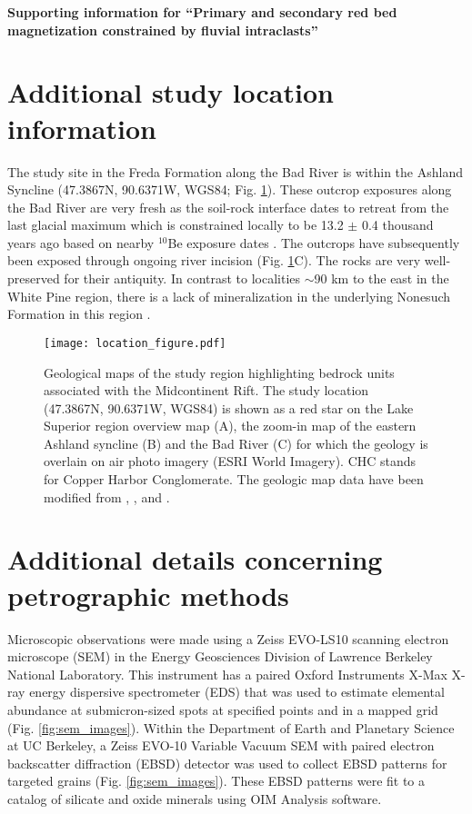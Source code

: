 \documentclass[11pt,letterpaper]{article}
\begin{document}
\begin{flushleft}
{\Large \textbf{Supporting information for ``Primary and secondary red bed magnetization constrained by fluvial intraclasts''}}

\end{flushleft}

\section*{Additional study location information}
The study site in the Freda Formation along the Bad River is within the Ashland Syncline (47.3867\textdegree N, 90.6371\textdegree W, WGS84; Fig. \ref{fig:location_figure}). These outcrop exposures along the Bad River are very fresh as the soil-rock interface dates to retreat from the last glacial maximum which is constrained locally to be 13.2 $\pm$ 0.4 thousand years ago based on nearby $^{10}$Be exposure dates \citep{Ullman2015a}. The outcrops have subsequently been exposed through ongoing river incision (Fig. \ref{fig:location_figure}C). The rocks are very well-preserved for their antiquity. In contrast to localities $\sim$90 km to the east in the White Pine region, there is a lack of mineralization in the underlying Nonesuch Formation in this region \citep{Stewart2017a}. 

\begin{figure}[!ht]
\noindent\texttt{[image: location\_figure.pdf]}
\caption{\small{Geological maps of the study region highlighting bedrock units associated with the Midcontinent Rift. The study location (47.3867\textdegree N, 90.6371\textdegree W, WGS84) is shown as a red star on the Lake Superior region overview map (A), the zoom-in map of the eastern Ashland syncline (B) and the Bad River (C) for which the geology is overlain on air photo imagery (ESRI World Imagery). CHC stands for Copper Harbor Conglomerate. The geologic map data have been modified from \cite{Survey2011a}, \cite{Nicholson2004a}, and \cite{Jirsa2011a}.}}
\label{fig:location_figure}
\end{figure} 

\section*{Additional details concerning petrographic methods}
Microscopic observations were made using a Zeiss EVO-LS10 scanning electron microscope (SEM) in the Energy Geosciences Division of Lawrence Berkeley National Laboratory. This instrument has a paired Oxford Instruments X-Max X-ray energy dispersive spectrometer (EDS) that was used to estimate elemental abundance at submicron-sized spots at specified points and in a mapped grid (Fig. \ref{fig:sem_images}). Within the Department of Earth and Planetary Science at UC Berkeley, a Zeiss EVO-10 Variable Vacuum SEM with paired electron backscatter diffraction (EBSD) detector was used to collect EBSD patterns for targeted grains (Fig. \ref{fig:sem_images}). These EBSD patterns were fit to a catalog of silicate and oxide minerals using OIM Analysis software.
\end{document}
